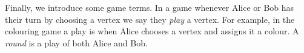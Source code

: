 Finally, we introduce some game terms. In a game whenever Alice or Bob has their turn by choosing a vertex we say they \textit{play} a vertex. For example, in the colouring game a play is when Alice chooses a vertex and assigns it a colour. A \textit{round} is a play of both Alice and Bob.  %


    
    
    
    
    
    
    
    
    
    
    
    
    
    
    
    
    
    
    
    